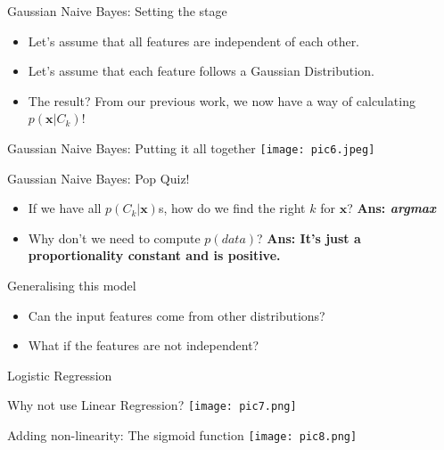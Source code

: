 \documentclass{beamer}
\begin{document}
\begin{frame}{Gaussian Naive Bayes: Setting the stage}
    \begin{itemize}
        \item Let's assume that all features are independent of each other.
        \item Let's assume that each feature follows a Gaussian Distribution.
        \item The result? From our previous work, we now have a way of calculating $p(\textbf{x} | C_k)$!
    \end{itemize}
\end{frame}

\begin{frame}{Gaussian Naive Bayes: Putting it all together}
    \texttt{[image: pic6.jpeg]}
\end{frame}

\begin{frame}{Gaussian Naive Bayes: Pop Quiz!}
\begin{itemize}
    \item If we have all $p(C_k | \textbf{x})$s, how do we find the right $k$ for $\textbf{x}$? \textbf{Ans: \textit{argmax}}
    \item Why don't we need to compute $p(data)$? \textbf{Ans: It's just a proportionality constant and is positive.}
\end{itemize}
\end{frame}

\begin{frame}{Generalising this model}
\begin{itemize}
    \item Can the input features come from other distributions? 
    \item What if the features are not independent?
\end{itemize}
\end{frame}

\begin{frame}
    Logistic Regression
\end{frame}

\begin{frame}{Why not use Linear Regression?}
    \texttt{[image: pic7.png]}
\end{frame}

\begin{frame}{Adding non-linearity: The sigmoid function}
    \texttt{[image: pic8.png]}
\end{frame}
\end{document}
